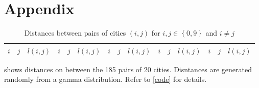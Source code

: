\documentclass[6pt,oneside]{article}
\begin{document}
\clearpage

\section*{Appendix}

\begin{table}[h]
    \center
    \caption{Distances between pairs of cities $(i,j)$ for $i,j \in \left\lbrace 0, 9\right\rbrace$ and $i\neq j$}
    \label{table:distances}
    \footnotesize
    \begin{tabular}{ccc|ccc|ccc|ccc|ccc}
        $i$ & $j$ & $ l(i, j)$ &
        $i$ & $j$ & $ l(i, j)$ &
        $i$ & $j$ & $ l(i, j)$ &
        $i$ & $j$ & $ l(i, j)$ &
        $i$ & $j$ & $ l(i, j)$
        \\
        \hline

    \end{tabular}

    \vspace{10pt}
    \footnotesize
     shows distances on between the 185 pairs of 20 cities.
    Disntances are generated randomly from a gamma distribution. Refer to \cref{code} for details.
\end{table}

\newpage


\end{document}
